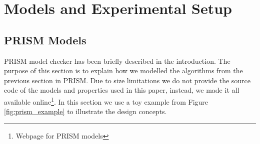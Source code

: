 \documentclass{llncs}
\begin{document}
\section{Models and Experimental Setup}

\subsection{PRISM Models}

PRISM model checker has been briefly described in the introduction. The purpose of this section is to explain how we modelled the algorithms from the previous section in PRISM. Due to size limitations we do not provide the source code of the models and properties used in this paper, instead, we made it all available online\footnote{Webpage for PRISM models}. In this section we use a toy example from Figure \ref{fig:prism_example} to illustrate the design concepts.
\end{document}
